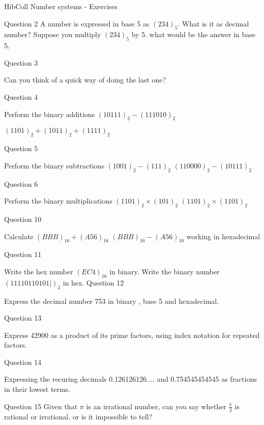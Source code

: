 \documentclass{article}
\begin{document}
HibColl Number systems - Exercises


Question 2
A number is expressed in base 5 as $(234)_5$. What is it as decimal number?
Suppose you multiply $(234)_5$ by 5. what would be the answer in base 5.

Question 3

Can you think of a quick way of doing the last one?

Question 4


Perform the binary additions
$(10111)_2 -(111010)_2$

$(1101)_2 + (1011)_2 + (1111)_2$

Question 5

Perform the binary subtractions
$(1001)_2 -(111)_2$
$(110000)_2 -(10111)_2$

Question 6

Perform the binary multiplications
$(1101)_2 \times (101)_2$
$(1101)_2 \times (1101)_2$

Question 10

Calculate $(BBB)_{16} + (A56)_{16}$
$(BBB)_{16} - (A56)_{16}$ working in hexadecimal


Question 11

Write the hex number $(EC4)_{16}$ in binary.
Write the binary number $(11110110101|)_2$ in hex.
Question 12

Express the decimal number 753 in binary , base 5 and hexadecimal.

Question 13

Express 42900 as a product of its prime factors, using index notation for repeated factors.

Question 14

Expressing the recuring decimals 0.126126126.... and 0.754545454545 as fractions in their lowest terms.

Question 15
Given that $\pi$ is an irrational number, can you say whether $\frac{\pi}{2}$ is rational or irrational.
or is it impossible to tell?
\end{document}
